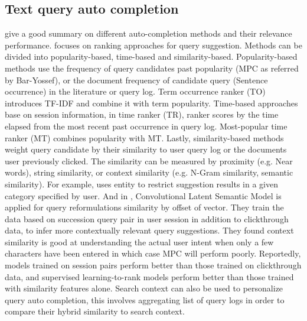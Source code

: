 \documentclass[12pt]{article} %
\begin{document}
\subsection{Text query auto completion}
\cite{cai_survey_2016}
\cite{di_santo_comparing_2015}
give a good summary on different auto-completion methods and their relevance
performance.
\cite{di_santo_comparing_2015} focuses on ranking approaches for query suggestion.
Methods can be divided into popularity-based, time-based and similarity-based.
Popularity-based methods use the frequency of query candidates past popularity (MPC as referred by Bar-Yossef), or the document frequency of candidate query (Sentence occurrence) in the literature or
query log. Term occurrence ranker (TO) introduces TF-IDF and combine it with term popularity.
Time-based approaches base on session information, in time ranker (TR), ranker scores by the time elapsed from the most recent past occurrence in query log. Most-popular time ranker (MT) combines popularity with MT.
Lastly, similarity-based methods weight query candidate by their similarity to user query log or the documents user previously clicked. The similarity can be measured by proximity (e.g. Near words), string similarity, or context similarity (e.g. N-Gram similarity, semantic similarity).
For example, \cite{schmidt_context_sensitive_2016} uses entity to restrict suggestion results in a given category specified by user. 
And in \cite{mitra_exploring_2015}, Convolutional Latent Semantic Model is applied for query reformulations similarity by offset of vector.
They train the data based on succession query pair in user session in addition to clickthrough data,
to infer more contextually relevant query suggestions.
They found context similarity is good at understanding the actual user intent when only a few characters have been entered in which case MPC will perform poorly.
Reportedly, models trained on session pairs perform better than those trained on clickthrough data, and supervised learning-to-rank models perform better than
those trained with similarity features alone.
Search context can also be used to personalize query auto completion, this involves aggregating list of query logs in order to compare their hybrid similarity to search context.
\end{document}
